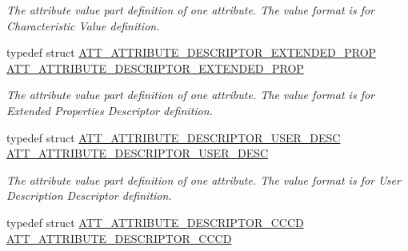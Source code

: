 \begin{DoxyCompactItemize}
\begin{DoxyCompactList}\small\item\em The attribute value part definition of one attribute. The value format is for Characteristic Value definition. \end{DoxyCompactList}\item 
typedef struct \hyperlink{struct_a_t_t___a_t_t_r_i_b_u_t_e___d_e_s_c_r_i_p_t_o_r___e_x_t_e_n_d_e_d___p_r_o_p}{A\+T\+T\+\_\+\+A\+T\+T\+R\+I\+B\+U\+T\+E\+\_\+\+D\+E\+S\+C\+R\+I\+P\+T\+O\+R\+\_\+\+E\+X\+T\+E\+N\+D\+E\+D\+\_\+\+P\+R\+OP} \hyperlink{group___b_l_e___g_a_t_t___s_e_r_v_i_c_e___t_a_b_l_e_ga4c53b3e5cfc90429628db4043854e648}{A\+T\+T\+\_\+\+A\+T\+T\+R\+I\+B\+U\+T\+E\+\_\+\+D\+E\+S\+C\+R\+I\+P\+T\+O\+R\+\_\+\+E\+X\+T\+E\+N\+D\+E\+D\+\_\+\+P\+R\+OP}\hypertarget{group___b_l_e___g_a_t_t___s_e_r_v_i_c_e___t_a_b_l_e_ga4c53b3e5cfc90429628db4043854e648}{}\label{group___b_l_e___g_a_t_t___s_e_r_v_i_c_e___t_a_b_l_e_ga4c53b3e5cfc90429628db4043854e648}

\begin{DoxyCompactList}\small\item\em The attribute value part definition of one attribute. The value format is for Extended Properties Descriptor definition. \end{DoxyCompactList}\item 
typedef struct \hyperlink{struct_a_t_t___a_t_t_r_i_b_u_t_e___d_e_s_c_r_i_p_t_o_r___u_s_e_r___d_e_s_c}{A\+T\+T\+\_\+\+A\+T\+T\+R\+I\+B\+U\+T\+E\+\_\+\+D\+E\+S\+C\+R\+I\+P\+T\+O\+R\+\_\+\+U\+S\+E\+R\+\_\+\+D\+E\+SC} \hyperlink{group___b_l_e___g_a_t_t___s_e_r_v_i_c_e___t_a_b_l_e_gac19d721386e33b423113deadf92842fa}{A\+T\+T\+\_\+\+A\+T\+T\+R\+I\+B\+U\+T\+E\+\_\+\+D\+E\+S\+C\+R\+I\+P\+T\+O\+R\+\_\+\+U\+S\+E\+R\+\_\+\+D\+E\+SC}\hypertarget{group___b_l_e___g_a_t_t___s_e_r_v_i_c_e___t_a_b_l_e_gac19d721386e33b423113deadf92842fa}{}\label{group___b_l_e___g_a_t_t___s_e_r_v_i_c_e___t_a_b_l_e_gac19d721386e33b423113deadf92842fa}

\begin{DoxyCompactList}\small\item\em The attribute value part definition of one attribute. The value format is for User Description Descriptor definition. \end{DoxyCompactList}\item 
typedef struct \hyperlink{struct_a_t_t___a_t_t_r_i_b_u_t_e___d_e_s_c_r_i_p_t_o_r___c_c_c_d}{A\+T\+T\+\_\+\+A\+T\+T\+R\+I\+B\+U\+T\+E\+\_\+\+D\+E\+S\+C\+R\+I\+P\+T\+O\+R\+\_\+\+C\+C\+CD} \hyperlink{group___b_l_e___g_a_t_t___s_e_r_v_i_c_e___t_a_b_l_e_gac2fde5d7bfc091ed0d6098dc23bd7195}{A\+T\+T\+\_\+\+A\+T\+T\+R\+I\+B\+U\+T\+E\+\_\+\+D\+E\+S\+C\+R\+I\+P\+T\+O\+R\+\_\+\+C\+C\+CD}\hypertarget{group___b_l_e___g_a_t_t___s_e_r_v_i_c_e___t_a_b_l_e_gac2fde5d7bfc091ed0d6098dc23bd7195}{}\label{group___b_l_e___g_a_t_t___s_e_r_v_i_c_e___t_a_b_l_e_gac2fde5d7bfc091ed0d6098dc23bd7195}


\end{DoxyCompactItemize}
